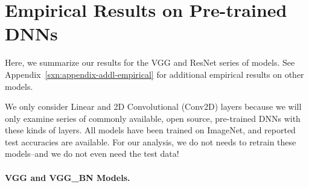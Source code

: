 
\section{Empirical Results on Pre-trained DNNs}
\label{sxn:emp}

Here, we summarize our results for the VGG and ResNet series of models.
See Appendix~\ref{sxn:appendix-addl-empirical} for additional empirical results on other models.

We only consider Linear and 2D Convolutional (Conv2D) layers because we will only examine series of commonly
available, open source, pre-trained DNNs with these kinds of layers.  All models have
been trained on ImageNet, and reported test accuracies are available.  For our analysis, we do not needs to retrain these
models--and we do not even need the test data!

\paragraph{VGG and VGG\_BN Models.}

